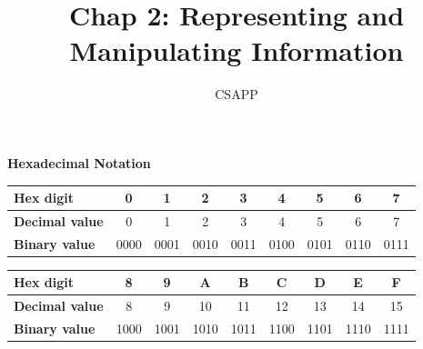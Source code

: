 \documentclass{article}
\title{Chap 2: Representing and Manipulating Information}
\author{CSAPP}
\begin{document}
\maketitle

\begin{center}
    \textbf{\large Hexadecimal Notation}
\end{center}

\vspace{1em}


\begin{center}
    \small
    \begin{tabular}{l|cccccccc}
        \toprule
        \textbf{Hex digit}     & 0 & 1 & 2 & 3 & 4 & 5 & 6 & 7 \\
        \midrule
        \textbf{Decimal value} & 0 & 1 & 2 & 3 & 4 & 5 & 6 & 7 \\
        \textbf{Binary value}  & 0000 & 0001 & 0010 & 0011 & 0100 & 0101 & 0110 & 0111 \\
        \bottomrule
    \end{tabular}
\end{center}

\vspace{1.5em}

\begin{center}
    \small
    \begin{tabular}{l|cccccccc}
        \toprule
        \textbf{Hex digit}     & 8 & 9 & A & B & C & D & E & F \\
        \midrule
        \textbf{Decimal value} & 8 & 9 & 10 & 11 & 12 & 13 & 14 & 15 \\
        \textbf{Binary value}  & 1000 & 1001 & 1010 & 1011 & 1100 & 1101 & 1110 & 1111 \\
        \bottomrule
    \end{tabular}
\end{center}
\end{document}
